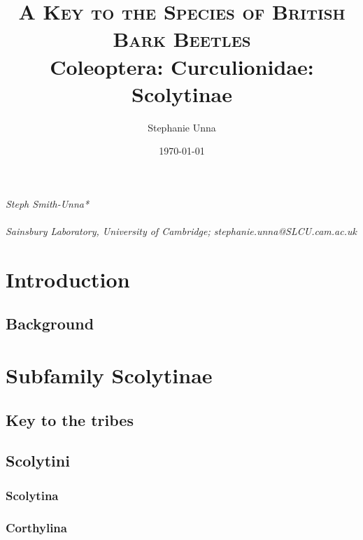 \documentclass[paper=a4, fontsize=11pt]{scrartcl}
\title{
\normalfont \normalsize
\textsc{A Key to the Species of British Bark Beetles} \\ [25pt] %
\huge Coleoptera: Curculionidae: Scolytinae \\ %
}
\author{Stephanie Unna}
\date{\normalsize\today}
\numberwithin{equation}{section} %
\numberwithin{figure}{section} %
\numberwithin{table}{section} %
\begin{document}
\maketitle %


\newpage

\fancyhead{}
\fancyfoot[L]{} %
\fancyfoot[C]{} %
\fancyfoot[R]{\thepage} %

\tableofcontents

{\it Steph Smith-Unna*} \hfill \\ [1ex]
 \hfill \\ [1ex]

{\it *Sainsbury Laboratory, University of Cambridge; stephanie.unna@SLCU.cam.ac.uk}

\newpage

\section{Introduction}
\label{sec:Introduction}
\doublespacing

\subsection{Background}

\section{Subfamily Scolytinae}
\label{sec:Tribes}
\doublespacing

\subsection{Key to the tribes}
\subsection{Scolytini}
\subsubsection{Scolytina}
\subsubsection{Corthylina}
\end{document}
